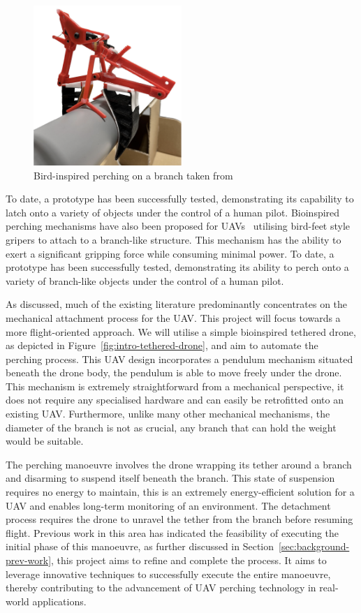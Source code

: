 \begin{figure}[htbp]
  \centering
  \includegraphics[width=0.5\textwidth]{background/perching-tum.png}
  \caption{Bird-inspired perching on a branch taken from~\cite{perching-tum-bird}}
\label{fig:perching-tum-bird}
\end{figure}

To date, a prototype has been successfully tested, demonstrating its capability to latch onto a variety of objects under the control of a human pilot.
Bioinspired perching mechanisms have also been proposed for UAVs~\cite{perching-tum-bird} utilising bird-feet style gripers to attach to a branch-like structure.
This mechanism has the ability to exert a significant gripping force while consuming minimal power.
To date, a prototype has been successfully tested, demonstrating its ability to perch onto a variety of branch-like objects under the control of a human pilot.

As discussed, much of the existing literature predominantly concentrates on the mechanical attachment process for the UAV.
This project will focus towards a more flight-oriented approach.
We will utilise a simple bioinspired tethered drone, as depicted in Figure~\ref{fig:intro-tethered-drone}, and aim to automate the perching process.
This UAV design incorporates a pendulum mechanism situated beneath the drone body, the pendulum is able to move freely under the drone.
This mechanism is extremely straightforward from a mechanical perspective, it does not require any specialised hardware and can easily be retrofitted onto an existing UAV.
Furthermore, unlike many other mechanical mechanisms, the diameter of the branch is not as crucial, any branch that can hold the weight would be suitable.

The perching manoeuvre involves the drone wrapping its tether around a branch and disarming to suspend itself beneath the branch. 
This state of suspension requires no energy to maintain, this is an extremely energy-efficient solution for a UAV and enables long-term monitoring of an environment. 
The detachment process requires the drone to unravel the tether from the branch before resuming flight. 
Previous work in this area has indicated the feasibility of executing the initial phase of this manoeuvre, as further discussed in Section~\ref{sec:background-prev-work}, this project aims to refine and complete the process. 
It aims to leverage innovative techniques to successfully execute the entire manoeuvre, thereby contributing to the advancement of UAV perching technology in real-world applications.

